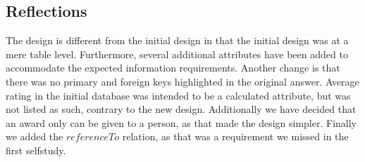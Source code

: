 \documentclass[10pt,a4paper,final]{report}
\begin{document}
\subsection*{Reflections}
The design is different from the initial design in that the initial design was at a mere table level. Furthermore, several additional attributes have been added to accommodate the expected information requirements.
Another change is that there was no primary and foreign keys highlighted in the original answer.
Average rating in the initial database was intended to be a calculated attribute, but was not listed as such, contrary to the new design.
Additionally we have decided that an award only can be given to a person, as that made the design simpler.
Finally we added the $referenceTo$ relation, as that was a requirement we missed in the first selfstudy.
\end{document}
